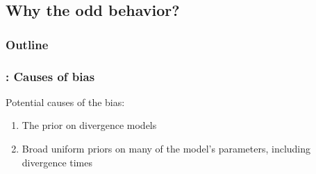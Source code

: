 \subsection{Why the odd behavior?}

\begin{frame}
\frametitle{Outline}
\end{frame}

\begin{frame}
    \frametitle{\msb: Causes of bias}
    Potential causes of the bias:
    \begin{enumerate}
        \item The prior on divergence models
        \item Broad uniform priors on many of the model's parameters, including
            divergence times
    \end{enumerate}
\end{frame}

